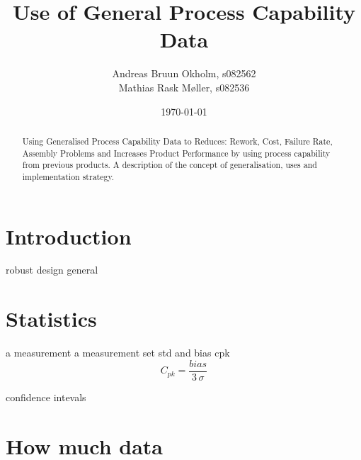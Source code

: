 \documentclass[aip,amsmath, reprint, author-year]{revtex4-1}
\begin{document}
\begin{abstract}
Using Generalised Process Capability Data to Reduces: Rework, Cost, Failure Rate, Assembly Problems and Increases Product Performance by using process capability from previous products.
A description of the concept of generalisation, uses and implementation strategy.
\end{abstract}

\title{Use of General Process Capability Data}
\author{Andreas Bruun Okholm, s082562\\
Mathias Rask Møller, s082536 }
 
\date{\today}
\maketitle


\section{Introduction}

robust design general

\section{Statistics}

a measurement
a measurement set
std and bias
cpk 
\begin{equation}
C_{pk} = \frac{bias}{3 \, \sigma}
\label{eq:sddj}
\end{equation}


confidence intevals

\section{How much data}
\end{document}
